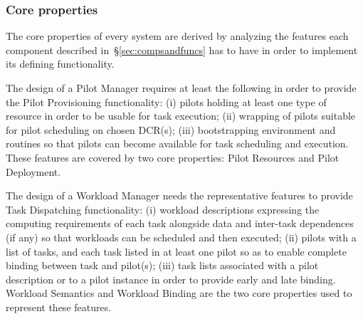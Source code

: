 \documentclass{sig-alternate}
\begin{document}

\subsubsection{Core properties}
\label{sec:coreprops}

The core properties of every \pilot system are derived by analyzing the features
each component described in~\S\ref{sec:compsandfuncs} has to have in order to
implement its defining functionality.

The design of a Pilot Manager requires at least the following in order to
provide the Pilot Provisioning functionality: (i) pilots holding at least one
type of resource in order to be usable for task execution; (ii) wrapping of
pilots suitable for pilot scheduling on chosen DCR(s); (iii) bootstrapping
environment and routines so that pilots can become available for task scheduling
and execution. These features are covered by two core properties: Pilot
Resources and Pilot Deployment.

The design of a Workload Manager needs the representative features to provide
Task Dispatching functionality: (i) workload descriptions expressing the
computing requirements of each task alongside data and inter-task dependences
(if any) so that workloads can be scheduled and then executed; (ii) pilots with
a list of tasks, and each task listed in at least one pilot so as to enable
complete binding between task and pilot(s); (iii) task lists associated with a
pilot description or to a pilot instance in order to provide early and late
binding. Workload Semantics and Workload Binding are the two core properties
used to represent these features.
\end{document}
